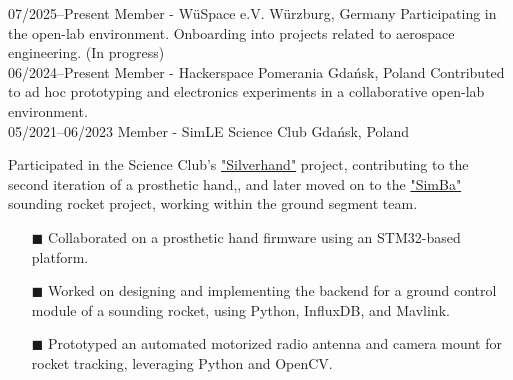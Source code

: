 \documentclass[9pt]{./src/packages/Developer_CV/developercv}
\begin{document}
\begin{entrylist}
    \entry
        {07/2025--Present}
        {Member - WüSpace e.V.}
        {Würzburg, Germany}
        {
            Participating in the open-lab environment. Onboarding into projects related to aerospace engineering. (In progress) \\
        }
    \entry
        {06/2024--Present}
        {Member - Hackerspace Pomerania}
        {Gdańsk, Poland}
        {
            Contributed to ad hoc prototyping and electronics experiments in a collaborative open-lab environment. \\
        }
    \entry
        {05/2021--06/2023}
        {Member - SimLE Science Club}
        {Gdańsk, Poland}
        {
            Participated in the Science Club’s \href{https://simle.pl/en/projekty/silverhand/}{"Silverhand"} project, contributing to the second iteration of a prosthetic hand,, and later moved on to the \href{https://simle.pl/en/projekty/simba/}{"SimBa"} sounding rocket project, working within the ground segment team.
        \begin{enumerate}
            \item[$\blacksquare$] Collaborated on a prosthetic hand firmware using an STM32-based platform.
            \item[$\blacksquare$] Worked on designing and implementing the backend for a ground control module of a sounding rocket, using Python, InfluxDB, and Mavlink.
            \item[$\blacksquare$] Prototyped an automated motorized radio antenna and camera mount for rocket tracking, leveraging Python and OpenCV.
        \end{enumerate}
        }
    \end{entrylist}

\vfill
\end{document}
